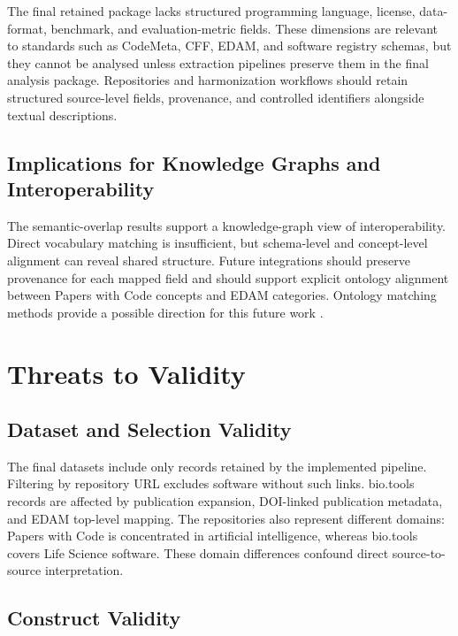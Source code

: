\documentclass[pdflatex,sn-mathphys-num]{sn-jnl}
\theoremstyle{thmstyleone}%
\theoremstyle{thmstyletwo}%
\theoremstyle{thmstylethree}%
\begin{document}
The final retained package lacks structured programming language, license, data-format, benchmark, and evaluation-metric fields. These dimensions are relevant to standards such as CodeMeta, CFF, EDAM, and software registry schemas, but they cannot be analysed unless extraction pipelines preserve them in the final analysis package. Repositories and harmonization workflows should retain structured source-level fields, provenance, and controlled identifiers alongside textual descriptions.

\subsection{Implications for Knowledge Graphs and Interoperability}
\label{subsec:discussion-kg}

The semantic-overlap results support a knowledge-graph view of interoperability. Direct vocabulary matching is insufficient, but schema-level and concept-level alignment can reveal shared structure. Future integrations should preserve provenance for each mapped field and should support explicit ontology alignment between Papers with Code concepts and EDAM categories. Ontology matching methods provide a possible direction for this future work \cite{Euzenat2013OntologyMatching,Otero2015OntologyMatching,Trojahn2022Foundational}.

\section{Threats to Validity}
\label{sec:threats}

\subsection{Dataset and Selection Validity}
\label{subsec:threats-dataset}

The final datasets include only records retained by the implemented pipeline. Filtering by repository URL excludes software without such links. bio.tools records are affected by publication expansion, DOI-linked publication metadata, and EDAM top-level mapping. The repositories also represent different domains: Papers with Code is concentrated in artificial intelligence, whereas bio.tools covers Life Science software. These domain differences confound direct source-to-source interpretation.

\subsection{Construct Validity}
\label{subsec:threats-construct}
\end{document}
